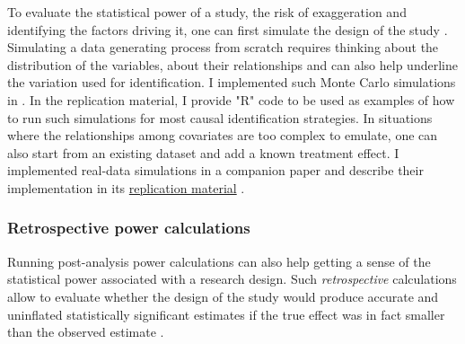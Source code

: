 \documentclass[usletter, 12pt]{article}
\begin{document}
				To evaluate the statistical power of a study, the risk of exaggeration and identifying the factors driving it, one can first simulate the design of the study \citep{hill_bayesian_2011, gelman_regression_2020, black_simulated_2021}. Simulating a data generating process from scratch requires thinking about the distribution of the variables, about their relationships and can also help underline the variation used for identification. %
			 I implemented such Monte Carlo simulations in . In the replication material, I provide "R" code to be used as examples of how to run such simulations for most causal identification strategies. In situations where the relationships among covariates are too complex to emulate, one can also start from an existing dataset and add a known treatment effect. I implemented real-data simulations in a companion paper and describe their implementation in its \href{https://vincentbagilet.github.io/inference_pollution/}{replication material} \citep{bagilet_accurately_2023}. 
			 
				
			\subsubsection{Retrospective power calculations}
			
				Running post-analysis power calculations can also help getting a sense of the statistical power associated with a research design. Such \textit{retrospective} calculations allow to evaluate whether the design of the study would produce accurate and uninflated statistically significant estimates if the true effect was in fact smaller than the observed estimate \citep{gelman_beyond_2014, ioannidis_power_2017, stommes_reliability_2021}. 
				
\end{document}
